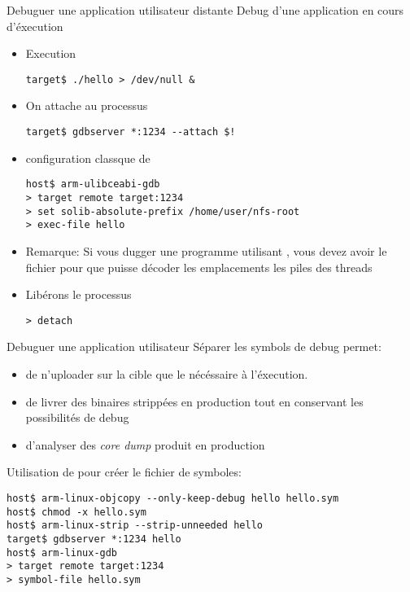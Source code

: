 \begin{frame}[fragile=singleslide]{Debuguer une application utilisateur distante}
  Debug d'une application en cours d'éxecution
  \begin{itemize}
  \item Execution
    \begin{lstlisting}
target$ ./hello > /dev/null & 
    \end{lstlisting}  
  \item On attache  au processus
    \begin{lstlisting}
target$ gdbserver *:1234 --attach $!
    \end{lstlisting}  
  \item configuration classque de 
    \begin{lstlisting}
host$ arm-ulibceabi-gdb
> target remote target:1234
> set solib-absolute-prefix /home/user/nfs-root
> exec-file hello
    \end{lstlisting}  
  \item   Remarque:   Si   vous   dugger   une   programme   utilisant
    ,     vous     devez     avoir     le     fichier
      pour   que    puisse   décoder  les
    emplacements les piles des threads
  \item Libérons le processus
    \begin{lstlisting}
> detach
    \end{lstlisting}  
  \end{itemize}
\end{frame}

\begin{frame}[fragile=singleslide]{Debuguer une application utilisateur}
  Séparer les symbols  de debug permet:
  \begin{itemize}
  \item de n'uploader sur la cible que le nécéssaire à l'éxecution.
  \item  de  livrer  des  binaires  strippées en  production  tout  en
    conservant les possibilités de debug
  \item d'analyser des \emph{core dump} produit en production
  \end{itemize}
  Utilisation de  pour créer le fichier de symboles:
  \begin{lstlisting}
host$ arm-linux-objcopy --only-keep-debug hello hello.sym
host$ chmod -x hello.sym
host$ arm-linux-strip --strip-unneeded hello 
target$ gdbserver *:1234 hello
host$ arm-linux-gdb
> target remote target:1234
> symbol-file hello.sym
    \end{lstlisting} 
\end{frame}
  
